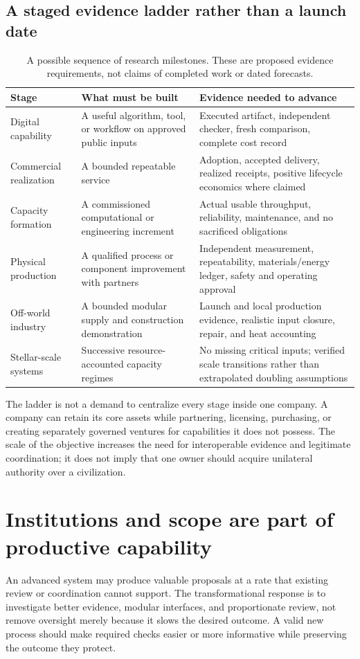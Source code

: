 \documentclass[11pt,letterpaper]{article}
\newcommand{\1}{\mathbf 1}
\theoremstyle{remark}\newtheorem{remark}{Remark}[section]
\begin{document}
\subsection{A staged evidence ladder rather than a launch date}
\begin{table}[htbp]\centering\small
\caption{A possible sequence of research milestones. These are proposed evidence requirements, not claims of completed work or dated forecasts.}
\begin{tabularx}{\linewidth}{@{}P{.17\linewidth}YY@{}}\toprule
Stage & What must be built & Evidence needed to advance\\\midrule
Digital capability & A useful algorithm, tool, or workflow on approved public inputs & Executed artifact, independent checker, fresh comparison, complete cost record\\
Commercial realization & A bounded repeatable service & Adoption, accepted delivery, realized receipts, positive lifecycle economics where claimed\\
Capacity formation & A commissioned computational or engineering increment & Actual usable throughput, reliability, maintenance, and no sacrificed obligations\\
Physical production & A qualified process or component improvement with partners & Independent measurement, repeatability, materials/energy ledger, safety and operating approval\\
Off-world industry & A bounded modular supply and construction demonstration & Launch and local production evidence, realistic input closure, repair, and heat accounting\\
Stellar-scale systems & Successive resource-accounted capacity regimes & No missing critical inputs; verified scale transitions rather than extrapolated doubling assumptions\\\bottomrule
\end{tabularx}\label{tab:ladder}
\end{table}

The ladder is not a demand to centralize every stage inside one company. A company can retain its core assets while partnering, licensing, purchasing, or creating separately governed ventures for capabilities it does not possess. The scale of the objective increases the need for interoperable evidence and legitimate coordination; it does not imply that one owner should acquire unilateral authority over a civilization.

\section{Institutions and scope are part of productive capability}\label{sec:institutions}
An advanced system may produce valuable proposals at a rate that existing review or coordination cannot support. The transformational response is to investigate better evidence, modular interfaces, and proportionate review, not remove oversight merely because it slows the desired outcome. A valid new process should make required checks easier or more informative while preserving the outcome they protect.
\end{document}

